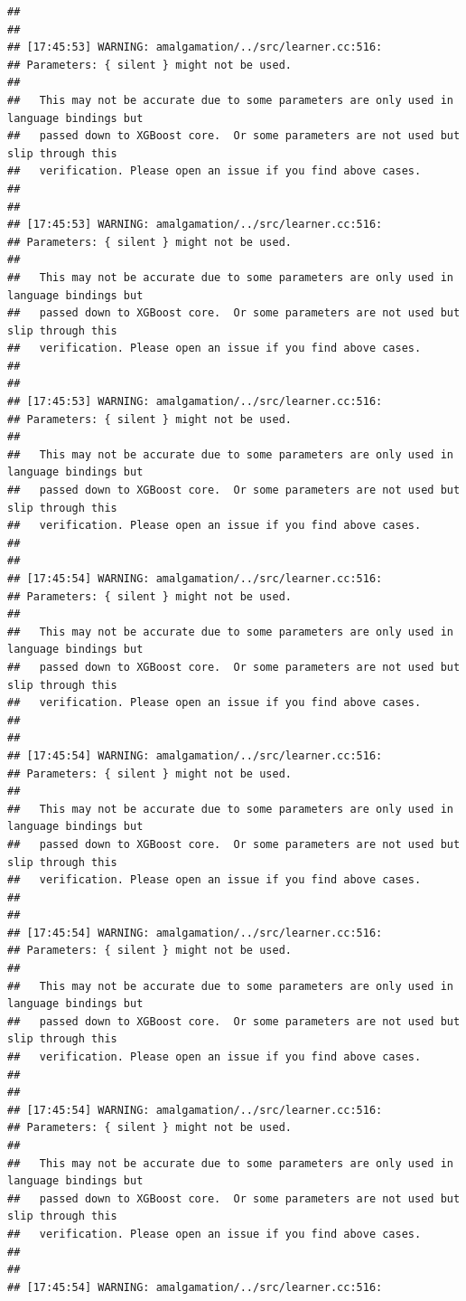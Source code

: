 \documentclass[AMS,STIX2COL]{WileyNJD-v2}\usepackage[]{graphicx}\usepackage[]{color}
\makeatletter
\newenvironment{kframe}{%
 \def\at@end@of@kframe{}%
 \ifinner\ifhmode%
  \def\at@end@of@kframe{\end{minipage}}%
  \begin{minipage}{\columnwidth}%
 \fi\fi%
 \def\FrameCommand##1{\hskip\@totalleftmargin \hskip-\fboxsep
 \colorbox{shadecolor}{##1}\hskip-\fboxsep
     \hskip-\linewidth \hskip-\@totalleftmargin \hskip\columnwidth}%
 \MakeFramed {\advance\hsize-\width
   \@totalleftmargin\z@ \linewidth\hsize
   \@setminipage}}%
 {\par\unskip\endMakeFramed%
 \at@end@of@kframe}
\newenvironment{knitrout}{}{} %
\makeatother
\begin{document}
\begin{knitrout}
\begin{kframe}
\begin{verbatim}
## 
## 
## [17:45:53] WARNING: amalgamation/../src/learner.cc:516: 
## Parameters: { silent } might not be used.
## 
##   This may not be accurate due to some parameters are only used in language bindings but
##   passed down to XGBoost core.  Or some parameters are not used but slip through this
##   verification. Please open an issue if you find above cases.
## 
## 
## [17:45:53] WARNING: amalgamation/../src/learner.cc:516: 
## Parameters: { silent } might not be used.
## 
##   This may not be accurate due to some parameters are only used in language bindings but
##   passed down to XGBoost core.  Or some parameters are not used but slip through this
##   verification. Please open an issue if you find above cases.
## 
## 
## [17:45:53] WARNING: amalgamation/../src/learner.cc:516: 
## Parameters: { silent } might not be used.
## 
##   This may not be accurate due to some parameters are only used in language bindings but
##   passed down to XGBoost core.  Or some parameters are not used but slip through this
##   verification. Please open an issue if you find above cases.
## 
## 
## [17:45:54] WARNING: amalgamation/../src/learner.cc:516: 
## Parameters: { silent } might not be used.
## 
##   This may not be accurate due to some parameters are only used in language bindings but
##   passed down to XGBoost core.  Or some parameters are not used but slip through this
##   verification. Please open an issue if you find above cases.
## 
## 
## [17:45:54] WARNING: amalgamation/../src/learner.cc:516: 
## Parameters: { silent } might not be used.
## 
##   This may not be accurate due to some parameters are only used in language bindings but
##   passed down to XGBoost core.  Or some parameters are not used but slip through this
##   verification. Please open an issue if you find above cases.
## 
## 
## [17:45:54] WARNING: amalgamation/../src/learner.cc:516: 
## Parameters: { silent } might not be used.
## 
##   This may not be accurate due to some parameters are only used in language bindings but
##   passed down to XGBoost core.  Or some parameters are not used but slip through this
##   verification. Please open an issue if you find above cases.
## 
## 
## [17:45:54] WARNING: amalgamation/../src/learner.cc:516: 
## Parameters: { silent } might not be used.
## 
##   This may not be accurate due to some parameters are only used in language bindings but
##   passed down to XGBoost core.  Or some parameters are not used but slip through this
##   verification. Please open an issue if you find above cases.
## 
## 
## [17:45:54] WARNING: amalgamation/../src/learner.cc:516: 

\end{verbatim}
\end{kframe}
\end{knitrout}
\end{document}
